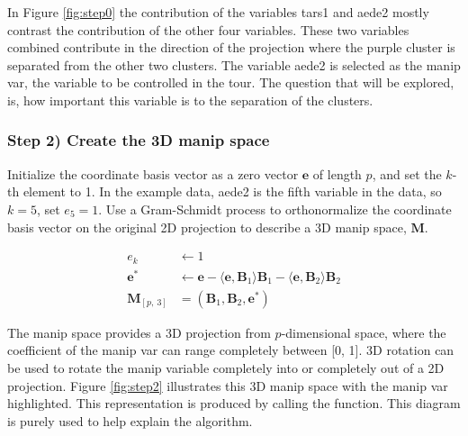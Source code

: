 In Figure \ref{fig:step0} the contribution of the variables tars1 and
aede2 mostly contrast the contribution of the other four variables.
These two variables combined contribute in the direction of the
projection where the purple cluster is separated from the other two
clusters. The variable aede2 is selected as the manip var, the variable
to be controlled in the tour. The question that will be explored, is,
how important this variable is to the separation of the clusters.

\hypertarget{step-2-create-the-3d-manip-space}{%
\subsubsection{Step 2) Create the 3D manip
space}\label{step-2-create-the-3d-manip-space}}

Initialize the coordinate basis vector as a zero vector \(\textbf{e}\)
of length \(p\), and set the \(k\)-th element to 1. In the example data,
aede2 is the fifth variable in the data, so \(k=5\), set \(e_5=1\). Use
a Gram-Schmidt process to orthonormalize the coordinate basis vector on
the original 2D projection to describe a 3D manip space, \(\textbf{M}\).

\begin{align*}
  e_k &\leftarrow 1 \\ 
  \textbf{e}^*   &\leftarrow \textbf{e} - \langle \textbf{e}, \textbf{B}_1 \rangle \textbf{B}_1 - \langle \textbf{e}, \textbf{B}_2 \rangle \textbf{B}_2 \\ 
  \textbf{M}_{[p,~3]} &= (\textbf{B}_1,\textbf{B}_2,\textbf{e}^*)
\end{align*}

The manip space provides a 3D projection from \(p\)-dimensional space,
where the coefficient of the manip var can range completely between
{[}0, 1{]}. 3D rotation can be used to rotate the manip variable
completely into or completely out of a 2D projection. Figure
\ref{fig:step2} illustrates this 3D manip space with the manip var
highlighted. This representation is produced by calling the
 function. This diagram is purely used to
help explain the algorithm.

